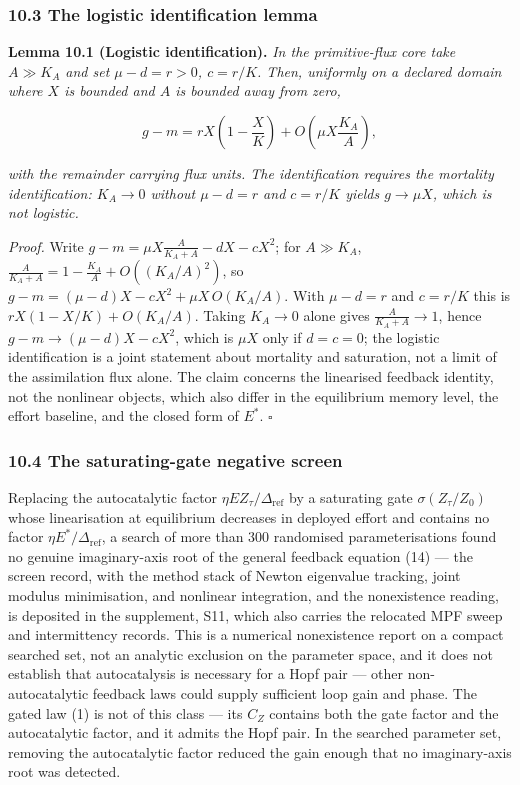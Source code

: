 \documentclass[11pt]{article}
\begin{document}
\subsubsection{10.3 The logistic identification
lemma}\label{the-logistic-identification-lemma}

\textbf{Lemma 10.1 (Logistic identification).} \emph{In the
primitive-flux core take \(A \gg K_A\) and set \(\mu - d = r > 0\),
\(c = r/K\). Then, uniformly on a declared domain where \(X\) is bounded
and \(A\) is bounded away from zero,}

\[g - m = rX\left(1 - \frac{X}{K}\right) + O\left(\mu X \frac{K_A}{A}\right),\]

\emph{with the remainder carrying flux units. The identification
requires the mortality identification: \(K_A \to 0\) without
\(\mu - d = r\) and \(c = r/K\) yields \(g \to \mu X\), which is not
logistic.}

\emph{Proof.} Write \(g - m = \mu X \frac{A}{K_A + A} - dX - cX^2\); for
\(A \gg K_A\), \(\frac{A}{K_A + A} = 1 - \frac{K_A}{A} + O((K_A/A)^2)\),
so \(g - m = (\mu - d)X - cX^2 + \mu X\,O(K_A/A)\). With \(\mu - d = r\)
and \(c = r/K\) this is \(rX(1 - X/K) + O(K_A/A)\). Taking \(K_A \to 0\)
alone gives \(\frac{A}{K_A + A} \to 1\), hence
\(g - m \to (\mu - d)X - cX^2\), which is \(\mu X\) only if
\(d = c = 0\); the logistic identification is a joint statement about
mortality and saturation, not a limit of the assimilation flux alone.
The claim concerns the linearised feedback identity, not the nonlinear
objects, which also differ in the equilibrium memory level, the effort
baseline, and the closed form of \(E^*\). \ensuremath{\square}

\subsubsection{10.4 The saturating-gate negative
screen}\label{the-saturating-gate-negative-screen}

Replacing the autocatalytic factor
\(\eta E Z_\tau/\Delta_{\mathrm{ref}}\) by a saturating gate
\(\sigma(Z_\tau/Z_0)\) whose linearisation at equilibrium decreases in
deployed effort and contains no factor
\(\eta E^*/\Delta_{\mathrm{ref}}\), a search of more than 300 randomised
parameterisations found no genuine imaginary-axis root of the general
feedback equation (14) --- the screen record, with the method stack of
Newton eigenvalue tracking, joint modulus minimisation, and nonlinear
integration, and the nonexistence reading, is deposited in the
supplement, S11, which also carries the relocated MPF sweep and
intermittency records. This is a numerical nonexistence report on a
compact searched set, not an analytic exclusion on the parameter space,
and it does not establish that autocatalysis is necessary for a Hopf
pair --- other non-autocatalytic feedback laws could supply sufficient
loop gain and phase. The gated law (1) is not of this class --- its
\(C_Z\) contains both the gate factor and the autocatalytic factor, and
it admits the Hopf pair. In the searched parameter set, removing the
autocatalytic factor reduced the gain enough that no imaginary-axis root
was detected.
\end{document}
